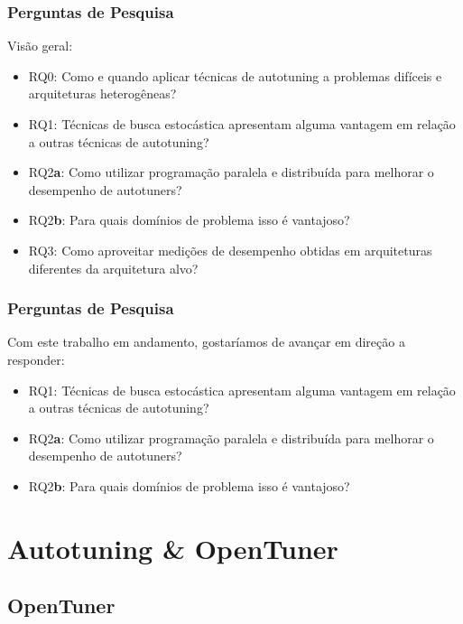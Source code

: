 \documentclass[10pt, compress]{beamer}
\begin{document}
\begin{frame}[fragile]
    \frametitle{Perguntas de Pesquisa}
    Visão geral:
    \begin{itemize}
        \item \alert{RQ0}: Como e quando aplicar técnicas de
            autotuning a problemas difíceis e arquiteturas heterogêneas?
            \pause
        \item \alert{RQ1}: Técnicas de busca estocástica apresentam
            alguma vantagem em relação a outras técnicas de autotuning?
            \pause
        \item \alert{RQ2\textbf{a}}: Como utilizar programação paralela e
            distribuída para melhorar o desempenho de autotuners?
        \item \alert{RQ2\textbf{b}}: Para quais domínios de problema isso é
            vantajoso?
            \pause
        \item \alert{RQ3}: Como aproveitar medições de desempenho obtidas
            em arquiteturas diferentes da arquitetura alvo?
    \end{itemize}
\end{frame}

\begin{frame}[fragile]
    \frametitle{Perguntas de Pesquisa}
    Com este trabalho em andamento, gostaríamos de avançar em
    direção a responder:
    \begin{itemize}
        \item \alert{RQ1}: Técnicas de busca estocástica apresentam
            alguma vantagem em relação a outras técnicas de autotuning?
        \item \alert{RQ2\textbf{a}}: Como utilizar programação paralela e
            distribuída para melhorar o desempenho de autotuners?
        \item \alert{RQ2\textbf{b}}: Para quais domínios de problema isso é
            vantajoso?
    \end{itemize}
\end{frame}

\section{Autotuning \& OpenTuner}

\subsection{OpenTuner}
\end{document}
